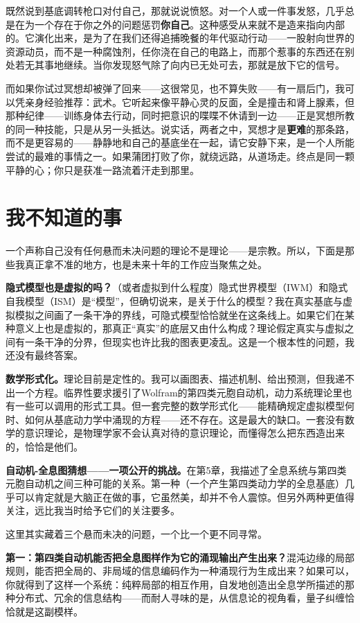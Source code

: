 \documentclass[11pt, twoside, openright]{book}
\begin{document}
既然说到基底调转枪口对付自己，那就说说愤怒。对一个人或一件事发怒，几乎总是在为一个存在于你之外的问题惩罚\textbf{你自己}。这种感受从来就不是造来指向内部的。它演化出来，是为了在我们还得追捕晚餐的年代驱动行动------一股射向世界的资源动员，而不是一种腐蚀剂，任你浇在自己的电路上，而那个惹事的东西还在别处若无其事地继续。当你发现怒气除了向内已无处可去，那就是放下它的信号。

而如果你试过冥想却被弹了回来------这很常见，也不算失败------有一扇后门，我可以凭亲身经验推荐：武术。它听起来像平静心灵的反面，全是撞击和肾上腺素，但那种纪律------训练身体去行动，同时把意识的喋喋不休请到一边------正是冥想所教的同一种技能，只是从另一头抵达。说实话，两者之中，冥想才是\textbf{更难}的那条路，而不是更容易的------静静地和自己的基底坐在一起，请它安静下来，是一个人所能尝试的最难的事情之一。如果蒲团打败了你，就绕远路，从道场走。终点是同一颗平静的心；你只是获准一路流着汗走到那里。

\section*{我不知道的事}

一个声称自己没有任何悬而未决问题的理论不是理论------是宗教。所以，下面是那些我真正拿不准的地方，也是未来十年的工作应当聚焦之处。

\textbf{隐式模型也是虚拟的吗？}（或者虚拟到什么程度）隐式世界模型（IWM）和隐式自我模型（ISM）是“模型”，但确切说来，是关于什么的模型？我在真实基底与虚拟模拟之间画了一条干净的界线，可隐式模型恰恰就坐在这条线上。如果它们在某种意义上也是虚拟的，那真正“真实”的底层又由什么构成？理论假定真实与虚拟之间有一条干净的分界，但现实也许比我的图表更凌乱。这是一个根本性的问题，我还没有最终答案。

\textbf{数学形式化。}理论目前是定性的。我可以画图表、描述机制、给出预测，但我递不出一个方程。临界性要求援引了Wolfram的第四类元胞自动机，动力系统理论里也有一些可以调用的形式工具。但一套完整的数学形式化------能精确规定虚拟模型何时、如何从基底动力学中涌现的方程------还不存在。这是最大的缺口。一套没有数学的意识理论，是物理学家不会认真对待的意识理论，而懂得怎么把东西造出来的，恰恰是他们。

\textbf{自动机-全息图猜想------一项公开的挑战。}在第5章，我描述了全息系统与第四类元胞自动机之间三种可能的关系。第一种（一个产生第四类动力学的全息基底）几乎可以肯定就是大脑正在做的事，它虽然美，却并不令人震惊。但另外两种更值得关注，远比我当时给予它们的关注要多。

这里其实藏着三个悬而未决的问题，一个比一个更不同寻常。

\textbf{第一：第四类自动机能否把全息图样作为它的涌现输出产生出来？}混沌边缘的局部规则，能否把全局的、非局域的信息编码作为一种涌现行为生成出来？如果可以，你就得到了这样一个系统：纯粹局部的相互作用，自发地创造出全息学所描述的那种分布式、冗余的信息结构------而耐人寻味的是，从信息论的视角看，量子纠缠恰恰就是这副模样。
\end{document}
